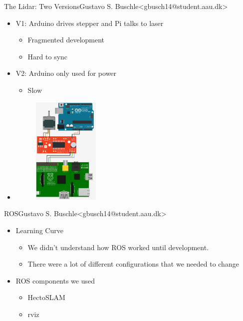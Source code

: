\begin{frame}{The Lidar: Two Versions}{Gustavo S. Buschle\newline<gbusch14@student.aau.dk>}
    \begin{itemize}
        \item <1-> V1: Arduino drives stepper and Pi talks to laser
            \begin{itemize}
                \item <2-> Fragmented development
                \item <3-> Hard to sync
            \end{itemize}
        \item <4-> V2: Arduino only used for power 
            \begin{itemize}
                \item <5-> Slow
            \end{itemize}
        \item <1-> \begin{figure}[h!]
            \includegraphics[width=0.3\textwidth]{images/steppermotor.png}
        \end{figure}
    \end{itemize}
\end{frame}

\begin{frame}{ROS}{Gustavo S. Buschle\newline<gbusch14@student.aau.dk>}
    \begin{itemize}
        \item <1-> Learning Curve
            \begin{itemize}
                \item <1-> We didn't understand how ROS worked until development.
                \item <2-> There were a lot of different configurations that we needed to change
            \end{itemize}
        \item <3-> ROS components we used
            \begin{itemize}
                \item <4-> HectoSLAM
                \item <5-> rviz
            \end{itemize}
    \end{itemize}
\end{frame}

